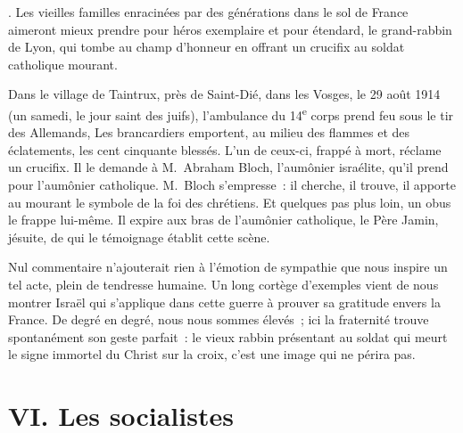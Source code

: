 \documentclass[french,twoside]{book} %
\newcommand\chapteropen{} %
\newcommand\chapterclose{} %
\begin{document}
{ }. Les vieilles familles enracinées par des générations dans le sol de France aimeront mieux prendre pour héros exemplaire et pour étendard, le grand-rabbin de Lyon, qui tombe au champ d’honneur en offrant un crucifix au soldat catholique mourant.‌\par
Dans le village de Taintrux, près de Saint-Dié, dans les Vosges, le 29 août 1914 (un samedi, le jour saint des juifs), l’ambulance du 14\textsuperscript{e} corps prend feu sous le tir des Allemands, Les brancardiers emportent, au milieu des flammes et des éclatements, les cent cinquante blessés. L’un de ceux-ci, frappé à mort, réclame un crucifix. Il le demande à M. Abraham Bloch, l’aumônier israélite, qu’il prend pour l’aumônier catholique. M. Bloch s’empresse : il cherche, il trouve, il apporte au mourant le symbole de la foi des chrétiens. Et quelques pas plus loin, un obus le frappe lui-même. Il expire aux bras de l’aumônier catholique, le Père Jamin, jésuite, de qui le témoignage établit cette scène.‌\par
Nul commentaire n’ajouterait rien à l’émotion de sympathie que nous inspire un tel acte, plein de tendresse humaine. Un long cortège d’exemples vient de nous montrer Israël qui s’applique dans cette guerre à prouver sa gratitude envers la France. De degré en degré, nous nous sommes élevés ; ici la fraternité trouve spontanément son geste parfait : le vieux rabbin présentant au soldat qui meurt le signe immortel du Christ sur la croix, c’est une image qui ne périra pas.‌
\chapterclose


\chapteropen
\chapter[{VI. Les socialistes}]{VI. Les socialistes}\renewcommand{\leftmark}{VI. Les socialistes}
\end{document}
